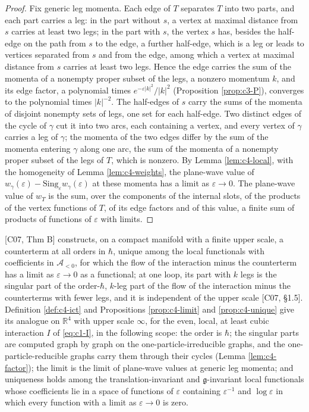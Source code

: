 \begin{proof}
Fix generic leg momenta. Each edge of $T$ separates $T$ into two parts, and each part carries a leg: in the part without $s$, a vertex at maximal distance from $s$ carries at least two legs; in the part with $s$, the vertex $s$ has, besides the half-edge on the path from $s$ to the edge, a further half-edge, which is a leg or leads to vertices separated from $s$ and from the edge, among which a vertex at maximal distance from $s$ carries at least two legs. Hence the edge carries the sum of the momenta of a nonempty proper subset of the legs, a nonzero momentum $k$, and its edge factor, a polynomial times $e^{-\varepsilon|k|^2}/|k|^2$ (Proposition \ref{prop:c3-P}), converges to the polynomial times $|k|^{-2}$. The half-edges of $s$ carry the sums of the momenta of disjoint nonempty sets of legs, one set for each half-edge. Two distinct edges of the cycle of $\gamma$ cut it into two arcs, each containing a vertex, and every vertex of $\gamma$ carries a leg of $\gamma$; the momenta of the two edges differ by the sum of the momenta entering $\gamma$ along one arc, the sum of the momenta of a nonempty proper subset of the legs of $T$, which is nonzero. By Lemma \ref{lem:c4-local}, with the homogeneity of Lemma \ref{lem:c4-weights}, the plane-wave value of $w_\gamma(\varepsilon)-\mathrm{Sing}_\varepsilon w_\gamma(\varepsilon)$ at these momenta has a limit as $\varepsilon\to0$. The plane-wave value of $w_T$ is the sum, over the components of the internal slots, of the products of the vertex functions of $T$, of its edge factors and of this value, a finite sum of products of functions of $\varepsilon$ with limits.
\end{proof}

\begin{remark}
\label{rem:c4-thmB}
[C07, Thm B] constructs, on a compact manifold with a finite upper scale, a counterterm at all orders in $\hbar$, unique among the local functionals with coefficients in $\mathscr A_{<0}$, for which the flow of the interaction minus the counterterm has a limit as $\varepsilon\to0$ as a functional; at one loop, its part with $k$ legs is the singular part of the order-$\hbar$, $k$-leg part of the flow of the interaction minus the counterterms with fewer legs, and it is independent of the upper scale [C07, §1.5]. Definition \ref{def:c4-ict} and Propositions \ref{prop:c4-limit} and \ref{prop:c4-unique} give its analogue on $\mathbb R^4$ with upper scale $\infty$, for the even, local, at least cubic interaction $I$ of \eqref{eq:c1-I}, in the following scope: the order is $\hbar$; the singular parts are computed graph by graph on the one-particle-irreducible graphs, and the one-particle-reducible graphs carry them through their cycles (Lemma \ref{lem:c4-factor}); the limit is the limit of plane-wave values at generic leg momenta; and uniqueness holds among the translation-invariant and $\mathfrak g$-invariant local functionals whose coefficients lie in a space of functions of $\varepsilon$ containing $\varepsilon^{-1}$ and $\log\varepsilon$ in which every function with a limit as $\varepsilon\to0$ is zero.
\end{remark}

